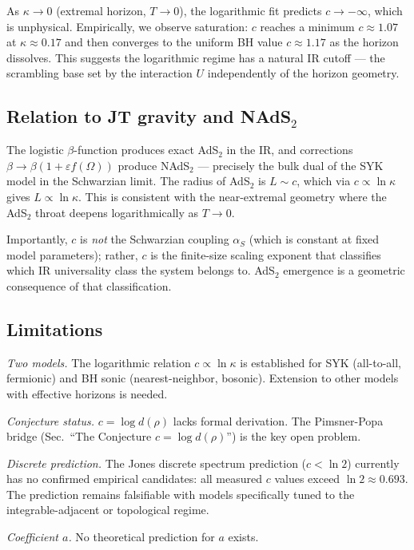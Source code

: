 \documentclass[aps,prl,twocolumn,superscriptaddress,showpacs]{revtex4-2}
\begin{document}
As $\kappa \to 0$ (extremal horizon, $T\to 0$), the logarithmic fit
predicts $c \to -\infty$, which is unphysical. Empirically, we observe
saturation: $c$ reaches a minimum $c \approx 1.07$ at $\kappa \approx 0.17$
and then converges to the uniform BH value $c \approx 1.17$ as the horizon
dissolves. This suggests the logarithmic regime has a natural IR cutoff
--- the scrambling base set by the interaction $U$ independently of the
horizon geometry.

\subsection{Relation to JT gravity and NAdS$_2$}

The logistic $\beta$-function produces exact AdS$_2$ in the IR, and
corrections $\beta \to \beta(1 + \varepsilon f(\Omega))$ produce NAdS$_2$
--- precisely the bulk dual of the SYK model in the Schwarzian limit.
The radius of AdS$_2$ is $L \sim c$, which via $c \propto \ln\kappa$
gives $L \propto \ln\kappa$. This is consistent with the near-extremal
geometry where the AdS$_2$ throat deepens logarithmically as $T\to 0$.

Importantly, $c$ is \emph{not} the Schwarzian coupling $\alpha_S$
(which is constant at fixed model parameters); rather, $c$ is the
finite-size scaling exponent that classifies which IR universality class
the system belongs to. AdS$_2$ emergence is a geometric consequence of
that classification.

\subsection{Limitations}

\textit{Two models.} The logarithmic relation $c \propto \ln\kappa$ is
established for SYK (all-to-all, fermionic) and BH sonic (nearest-neighbor,
bosonic). Extension to other models with effective horizons is needed.

\textit{Conjecture status.} $c = \log d(\rho)$ lacks formal derivation.
The Pimsner-Popa bridge (Sec.\ ``The Conjecture $c = \log d(\rho)$'') is the key open
problem.

\textit{Discrete prediction.} The Jones discrete spectrum prediction
($c < \ln 2$) currently has no confirmed empirical candidates: all
measured $c$ values exceed $\ln 2 \approx 0.693$. The prediction
remains falsifiable with models specifically tuned to the
integrable-adjacent or topological regime.

\textit{Coefficient $a$.} No theoretical prediction for $a$ exists.
\end{document}
